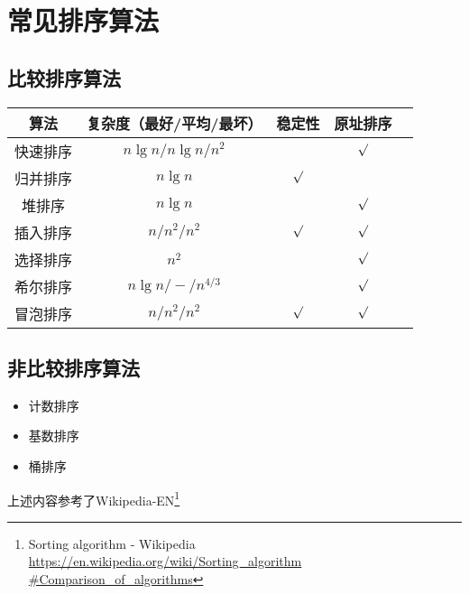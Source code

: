\section{常见排序算法}
\subsection{比较排序算法}
\begin{tabular}{|c|c|c|c|c|}
	\hline
	算法     & 复杂度（最好/平均/最坏） & 稳定性  & 原址排序 \\ \hline
	快速排序 & $n\lg n/n\lg n/n^2$      &         & $\surd$  \\	\hline
	归并排序 & $n\lg n$                 & $\surd$ &          \\ \hline
	堆排序   & $n\lg n$                 &         & $\surd$  \\ \hline
	插入排序 & $n/n^2/n^2$              & $\surd$ & $\surd$  \\ \hline
	选择排序 & $n^2$                    &         & $\surd$  \\ \hline
	希尔排序 & $n\lg n/-/n^{4/3}$       &         & $\surd$  \\ \hline
	冒泡排序 & $n/n^2/n^2$              & $\surd$ & $\surd$  \\ \hline
\end{tabular}
\subsection{非比较排序算法}
\begin{itemize}
	\item 计数排序
	\item 基数排序
	\item 桶排序
\end{itemize}
上述内容参考了Wikipedia-EN\footnote{Sorting algorithm - Wikipedia
	\url{https://en.wikipedia.org/wiki/Sorting\_algorithm
		\#Comparison\_of\_algorithms}
}
